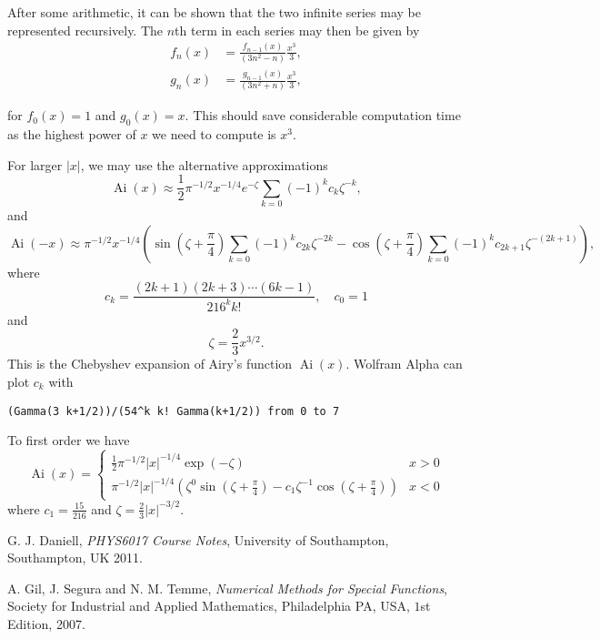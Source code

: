 \documentclass[]{article}
\renewcommand{\mod}[1]{\ensuremath{\lvert {#1} \rvert}}
\newcommand{\Ai}[1]{\ensuremath{\operatorname{Ai}({#1})}}
\begin{document}
After some arithmetic, it can be shown that the two infinite series may be represented recursively. The $n$th term in each series may then be given by
\begin{align*}
f_{n}(x) &= \frac{f_{n-1}(x)}{(3n^{2} - n)} \frac{x^{3}}{3},\\ 
g_{n}(x) &= \frac{g_{n-1}(x)}{(3n^{2} + n)} \frac{x^{3}}{3},
\end{align*}

for $f_{0}(x) = 1$ and $g_{0}(x) = x$. This should save considerable computation time as the highest power of $x$ we need to compute is $x^{3}$.

For larger $\mod{x}$, we may use the alternative approximations
\[
\Ai{x} \approx \frac{1}{2}\pi^{-1/2}x^{-1/4}e^{-\zeta} \sum\limits_{k=0} (-1)^{k}c_{k}\zeta^{-k},
\]
and
\[
\Ai{-x} \approx \pi^{-1/2}x^{-1/4}\left (
	\sin{(\zeta + \frac{\pi}{4})}\sum\limits_{k=0}(-1)^{k}c_{2k}\zeta^{-2k} -
	\cos{(\zeta + \frac{\pi}{4})}\sum\limits_{k=0}(-1)^{k}c_{2k+1}\zeta^{-(2k+1)}
\right ),
\]
where
\[
c_{k} = \frac{(2k+1)(2k+3)\dotsb(6k-1)}{216^{k}k!}, \quad c_{0} = 1
\]
and
\[
\zeta = \frac{2}{3}x^{3/2}.
\]
This is the Chebyshev expansion of Airy's function $\Ai{x}$\cite{ref:agil}. Wolfram Alpha can plot $c_{k}$ with
\begin{verbatim}
(Gamma(3 k+1/2))/(54^k k! Gamma(k+1/2)) from 0 to 7
\end{verbatim}

To first order we have
\[
\Ai{x} = \begin{cases}
	\frac{1}{2}\pi^{-1/2}\mod{x}^{-1/4}\exp{(-\zeta)} & x > 0\\
	\pi^{-1/2}\mod{x}^{-1/4} \left (
		\zeta^{0}\sin{(\zeta + \frac{\pi}{4})} - c_{1}\zeta^{-1}\cos{(\zeta + \frac{\pi}{4})}
	\right ) & x < 0
\end{cases}
\]
where $c_{1} = \frac{15}{216}$ and $\zeta = \frac{2}{3}\mod{x}^{-3/2}$.

\begin{thebibliography}{9}
  G. J. Daniell,
  \emph{PHYS6017 Course Notes},
  University of Southampton, Southampton, UK
  2011.
  
  A. Gil, J. Segura and N. M. Temme,
  \emph{Numerical Methods for Special Functions},
  Society for Industrial and Applied Mathematics, Philadelphia PA, USA,
  $1$st Edition,
  2007.
\end{thebibliography}
\end{document}

